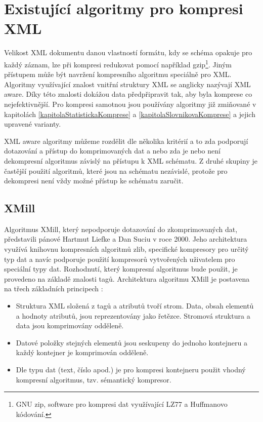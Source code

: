 \chapter{Existující algoritmy pro kompresi XML}
\label{kapitolaXmlAlgoritmy}

Velikost XML dokumentu danou vlastností formátu, kdy se schéma opakuje pro každý záznam, lze při kompresi redukovat pomocí například gzip\footnote{GNU zip, software pro kompresi dat využívající LZ77 a Huffmanovo kódování.}. Jiným přístupem může být navržení kompresního algoritmu speciálně pro XML. Algoritmy využívající znalost vnitřní struktury XML se anglicky nazývají XML aware. Díky této znalosti dokážou data předpřipravit tak, aby byla komprese co nejefektivnější. Pro kompresi samotnou jsou používány algoritmy již zmiňované v kapitolách \ref{kapitolaStatistickaKomprese} a \ref{kapitolaSlovnikovaKomprese} a jejich upravené varianty.

XML aware algoritmy můžeme rozdělit dle několika kritérií a to zda podporují dotazování a přístup do komprimovaných dat a nebo zda je nebo není dekompresní algoritmus závislý na přístupu k XML schématu. Z druhé skupiny je častější použití algoritmů, které jsou na schématu nezávislé, protože pro dekompresi není vždy možné přístup ke schématu zaručit.

\section{XMill}
Algoritmus XMill, který nepodporuje dotazování do zkomprimovaných dat, představili pánové Hartmut Liefke a Dan Suciu v roce 2000. Jeho architektura využívá knihovnu kompresních algoritmů zlib, specifické kompresory pro určitý typ dat a navíc podporuje použití kompresorů vytvořených uživatelem pro speciální typy dat. Rozhodnutí, který kompresní algoritmus bude použit, je provedeno na základě znalosti tagů. Architektura algoritmu XMill je postavena na třech základních principech \cite{xmill}:

\begin{itemize}
\item Struktura XML složená z tagů a atributů tvoří strom. Data, obsah elementů a hodnoty atributů, jsou reprezentovány jako řetězce. Stromová struktura a data jsou komprimovány odděleně.
\item Datové položky stejných elementů jsou seskupeny do jednoho kontejneru a každý kontejner je komprimován odděleně.
\item Dle typu dat (text, číslo apod.) je pro kompresi kontejneru použit vhodný kompresní algoritmus, tzv. sémantický kompresor.
\end{itemize}


